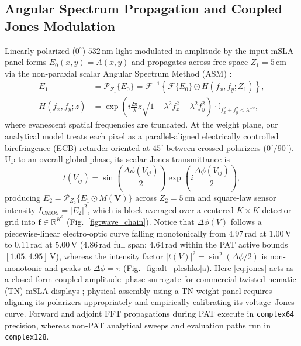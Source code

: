 \documentclass[journal]{IEEEtran}
\begin{document}
\subsection{Angular Spectrum Propagation and Coupled Jones Modulation}
Linearly polarized ($0^\circ$) $532\,\text{nm}$ light modulated in amplitude by the input mSLA panel forms $E_0(x,y) = A(x,y)$ and propagates across free space $Z_1 = 5\,\text{cm}$ via the non-paraxial scalar Angular Spectrum Method (ASM) \cite{goodman2017fourier}:
\begin{align}
  E_1 &= \mathcal{P}_{Z_1}\{E_0\} = \mathcal{F}^{-1}\!\left\{\mathcal{F}\{E_0\} \odot H(f_x, f_y; Z_1)\right\}, \label{eq:asm} \\
  H(f_x, f_y; z) &= \exp\!\left(i\frac{2\pi}{\lambda}z\sqrt{1 - \lambda^2 f_x^2 - \lambda^2 f_y^2}\right) \cdot \mathbb{I}_{f_x^2+f_y^2 < \lambda^{-2}}, \label{eq:transfer}
\end{align}
where evanescent spatial frequencies are truncated. At the weight plane, our analytical model treats each pixel as a parallel-aligned electrically controlled birefringence (ECB) retarder oriented at $45^\circ$ between crossed polarizers ($0^\circ/90^\circ$). Up to an overall global phase, its scalar Jones transmittance is
\begin{equation}
  t(V_{ij}) = \sin\!\left(\frac{\Delta\phi(V_{ij})}{2}\right) \exp\!\left(i\frac{\Delta\phi(V_{ij})}{2}\right),
  \label{eq:jones}
\end{equation}
producing $E_2 = \mathcal{P}_{Z_2}\{E_1 \odot M(\mathbf{V})\}$ across $Z_2 = 5\,\text{cm}$ and square-law sensor intensity $I_{\mathrm{CMOS}} = |E_2|^2$, which is block-averaged over a centered $K\times K$ detector grid into $\mathbf{f} \in \mathbb{R}^{K^2}$ (Fig.~\ref{fig:wave_chain}). Notice that $\Delta\phi(V)$ follows a piecewise-linear electro-optic curve falling monotonically from $4.97\,\text{rad}$ at $1.00\,\text{V}$ to $0.11\,\text{rad}$ at $5.00\,\text{V}$ ($4.86\,\text{rad}$ full span; $4.64\,\text{rad}$ within the PAT active bounds $[1.05, 4.95]\,\text{V}$), whereas the intensity factor $|t(V)|^2 = \sin^2(\Delta\phi/2)$ is non-monotonic and peaks at $\Delta\phi = \pi$ (Fig.~\ref{fig:alt_pleshko}a). Here \eqref{eq:jones} acts as a closed-form coupled amplitude--phase surrogate for commercial twisted-nematic (TN) mSLA displays \cite{lu1990lctv}; physical assembly using a TN weight panel requires aligning its polarizers appropriately and empirically calibrating its voltage--Jones curve. Forward and adjoint FFT propagations during PAT execute in \texttt{complex64} precision, whereas non-PAT analytical sweeps and evaluation paths run in \texttt{complex128}.
\end{document}
